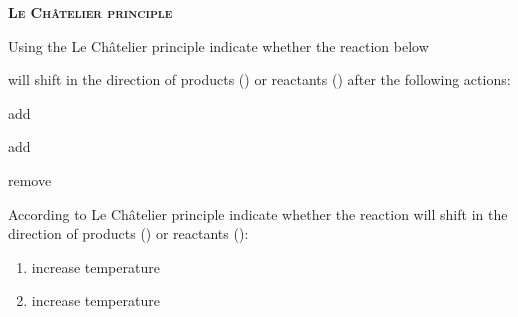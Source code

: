 \documentclass[main.tex]{subfiles}
\begin{document}
\begin{multicols*}{2}
{\raggedright\textsc{\textbf{Le Ch\^{a}telier principle}}\par}





\begin{question}[ID=\the\value{numA}]
Using the Le Ch\^{a}telier principle indicate whether the reaction below 
\begin{center}\end{center}
will shift in the direction of products (\ce{->}) or reactants (\ce{<-}) after the following actions:
  \begin{inparaenum}[(a)]
\item   add  %
\item  add %
\item  remove %
 \end{inparaenum}
\end{question}
\begin{solution}
\begin{inparaenum}[(a)]
\item  \ce{->}
\item   \ce{<-}
\item  \ce{<-}
 \end{inparaenum}
\hspace{0.1cm}\end{solution}%


\begin{question}[ID=\the\value{numA}]
According to Le Ch\^{a}telier principle indicate whether the reaction will shift in the direction of products (\ce{->}) or reactants (\ce{<-}):
 \begin{enumerate}[label=(\alph*)]	
\item {} \hspace{1cm} increase temperature%
\item {} \hspace{1cm} increase temperature%
 \end{enumerate}
\end{question}
\begin{solution}
\begin{inparaenum}[(a)]
\item   \ce{<-}
\item  \ce{->}
 \end{inparaenum}
\hspace{0.1cm}\end{solution}%



\end{multicols*}
\end{document}
